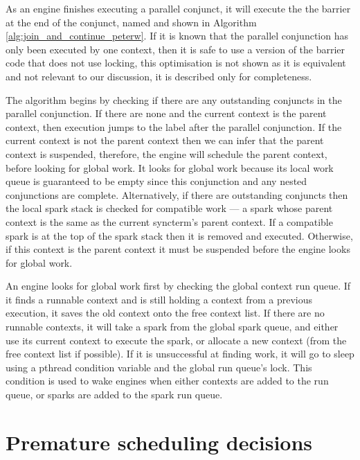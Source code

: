 As an engine finishes executing a parallel conjunct,
it will execute the the barrier at the end of the conjunct,
named \joinandcontinue and shown in 
Algorithm \ref{alg:join_and_continue_peterw}.
If it is known that the parallel conjunction has only been executed by
one context,
then it is safe to use a version of the barrier code that does not use
locking,
this optimisation is not shown as it is equivalent and not relevant to
our discussion,
it is described only for completeness.

The algorithm begins by checking if there are any outstanding conjuncts in
the parallel conjunction.
If there are none and the current context is the parent
context,
then execution jumps to the label after the parallel conjunction.
If the current context is not the parent context then
we can infer that the parent context is suspended,
therefore, 
the engine will schedule the parent context, before looking for global work.
It looks for global work because its local work queue is guaranteed to be
empty since this conjunction and any nested conjunctions are complete.
Alternatively, if there are outstanding conjuncts then
the local spark stack is checked for compatible work ---
a spark whose parent context is the same as the current syncterm's parent
context.
If a compatible spark is at the top of the spark stack then it is removed
and executed.
Otherwise,
if this context is the parent context it must be suspended
before the engine looks for global work.

An engine looks for global work first by checking the global context run queue.
If it finds a runnable context and is still holding a context from a
previous execution, it saves the old context onto the free context list.
If there are no runnable contexts,
it will take a spark from the global spark queue,
and either use its current context to execute the spark,
or allocate a new context (from the free context list if possible).
If it is unsuccessful at finding work,
it will go to sleep using a pthread condition variable and the global run
queue's lock.
This condition is used to wake engines when either contexts are added to the
run queue,
or sparks are added to the spark run queue.

\section{Premature scheduling decisions}


